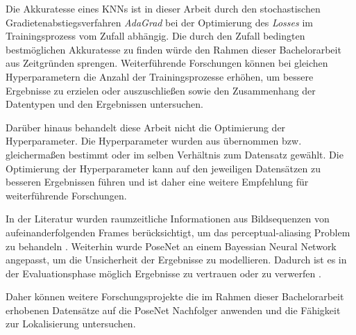 Die Akkuratesse eines KNNs ist in dieser Arbeit durch den stochastischen Gradietenabstiegsverfahren \textit{AdaGrad} bei der Optimierung des \textit{Losses} im Trainingsprozess vom Zufall abhängig. Die durch den Zufall bedingten bestmöglichen Akkuratesse zu finden würde den Rahmen dieser Bachelorarbeit aus Zeitgründen sprengen. Weiterführende Forschungen können bei gleichen Hyperparametern die Anzahl der Trainingsprozesse erhöhen, um bessere Ergebnisse zu erzielen oder auszuschließen sowie den Zusammenhang der Datentypen und den Ergebnissen untersuchen. 


Darüber hinaus behandelt diese Arbeit nicht die Optimierung der Hyperparameter. Die Hyperparameter wurden aus \citet{acharyaBIMPoseNetIndoorCamera2019} übernommen bzw. gleichermaßen bestimmt oder im selben Verhältnis zum Datensatz gewählt. Die Optimierung der Hyperparameter kann auf den jeweiligen Datensätzen zu besseren Ergebnissen führen und ist daher eine weitere Empfehlung für weiterführende Forschungen. 

In der Literatur wurden raumzeitliche Informationen aus Bildsequenzen von aufeinanderfolgenden Frames berücksichtigt, um das perceptual-aliasing Problem zu behandeln \cite{walchImageBasedLocalizationUsing2017, clarkVidLocDeepSpatioTemporal2017}. Weiterhin wurde PoseNet an einem Bayessian Neural Network angepasst, um die Unsicherheit der Ergebnisse zu modellieren. Dadurch ist es in der Evaluationsphase möglich Ergebnisse zu vertrauen oder zu verwerfen \cite{kendallModellingUncertaintyDeep2016}. 


Daher können weitere Forschungsprojekte die im Rahmen dieser Bachelorarbeit erhobenen Datensätze auf die PoseNet Nachfolger \cite{kendallModellingUncertaintyDeep2016, walchImageBasedLocalizationUsing2017, clarkVidLocDeepSpatioTemporal2017} anwenden und die Fähigkeit zur Lokalisierung untersuchen.